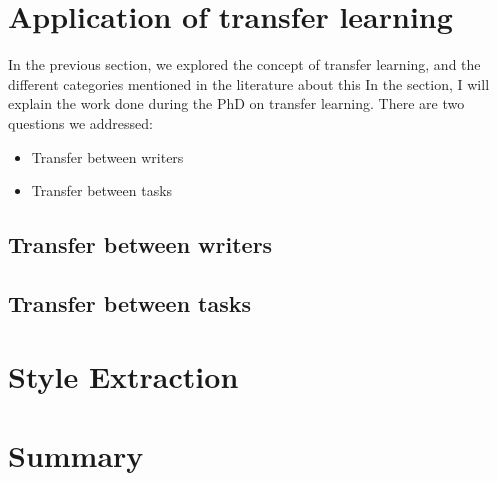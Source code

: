 \section{Application of transfer learning}
  \par In the previous section, we explored the concept of transfer learning, and the different categories mentioned in the literature about this
  In the section, I will explain the work done during the PhD on transfer learning. There are two questions we addressed:
  \begin{itemize}[noitemsep]
      \item Transfer between writers
      \item Transfer between tasks
  \end{itemize}

  \subsection{Transfer between writers}
  \subsection{Transfer between tasks}

\section{Style Extraction}

\section{Summary}

